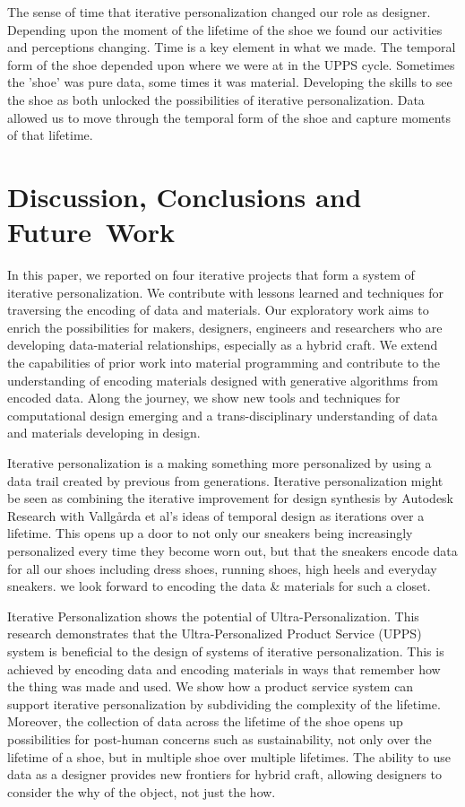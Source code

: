 The sense of time that iterative personalization changed our role as designer. Depending upon the moment of the lifetime of the shoe we found our activities and perceptions changing. Time is a key element in what we made. The temporal form of the shoe depended upon where we were at in the UPPS cycle. Sometimes the 'shoe' was pure data, some times it was material. Developing the skills to see the shoe as both unlocked the possibilities of iterative personalization. Data allowed us to move through the temporal form of the shoe and capture moments of that lifetime. 

\section{Discussion, Conclusions and Future~Work}
In this paper, we reported on four iterative projects that form a system of iterative personalization. We contribute with lessons learned and techniques for traversing the encoding of data and materials. Our exploratory work aims to enrich the possibilities for makers, designers, engineers and researchers who are developing data-material relationships, especially as a hybrid craft. We extend the capabilities of prior work into material programming \cite{Vallgarda2016} and contribute to the understanding of encoding materials designed with generative algorithms from encoded data. Along the journey, we show new tools and techniques for computational design emerging and a trans-disciplinary understanding of data and materials developing in design. 

Iterative personalization is a making something more personalized by using a data trail created by previous from generations. Iterative personalization might be seen as combining the iterative improvement for design synthesis by Autodesk Research \cite{Nourbakhsh2016} with Vallg\aa rda et al's ideas of temporal design \cite{Vallgarda2015} as iterations over a lifetime.  This opens up a door to not only our sneakers being increasingly personalized every time they become worn out, but that the sneakers encode data for all our shoes including dress shoes, running shoes, high heels and everyday sneakers. we look forward to encoding the data \& materials for such a closet. 

Iterative Personalization shows the potential of Ultra-Personalization. 
This research demonstrates that the Ultra-Personalized Product Service (UPPS) system is beneficial to the design of systems of iterative personalization. This is achieved by encoding data and encoding materials in ways that remember how the thing was made and used. We show how a product service system can support iterative personalization by subdividing the complexity of the lifetime. Moreover, the collection of data across the lifetime of the shoe opens up possibilities for  post-human concerns such as sustainability, not only over the lifetime of a shoe, but in multiple shoe over multiple lifetimes. The ability to use data as a designer provides new frontiers for hybrid craft, allowing designers to consider the why of the object, not just the how. 

